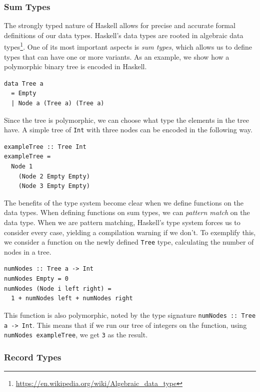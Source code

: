 \documentclass[a4paper,english]{ifimaster}
\begin{document}
\subsubsection{Sum Types}%
\label{ssub:a_powerful_type_system}

The strongly typed nature of Haskell allows for precise and accurate formal definitions of our data types. Haskell's data types are rooted in algebraic data types\footnote{\url{https://en.wikipedia.org/wiki/Algebraic_data_type}}. One of its most important aspects is \textit{sum types}, which allows us to define types that can have one or more variants. As an example, we show how a polymorphic binary tree is encoded in Haskell.

\begin{verbatim}
data Tree a
  = Empty
  | Node a (Tree a) (Tree a)
\end{verbatim}

Since the tree is polymorphic, we can choose what type the elements in the tree have. A simple tree of \texttt{Int} with three nodes can be encoded in the following way.

\begin{verbatim}
exampleTree :: Tree Int
exampleTree =
  Node 1
    (Node 2 Empty Empty)
    (Node 3 Empty Empty)
\end{verbatim}

The benefits of the type system become clear when we define functions on the data types. When defining functions on sum types, we can \textit{pattern match} on the data type. When we are pattern matching, Haskell's type system forces us to consider every case, yielding a compilation warning if we don't. To exemplify this, we consider a function on the newly defined \texttt{Tree} type, calculating the number of nodes in a tree.

\begin{verbatim}
numNodes :: Tree a -> Int
numNodes Empty = 0
numNodes (Node i left right) = 
  1 + numNodes left + numNodes right
\end{verbatim}

This function is also polymorphic, noted by the type signature \texttt{numNodes :: Tree a -> Int}. This means that if we run our tree of integers on the function, using \texttt{numNodes exampleTree}, we get \texttt{3} as the result.

\subsubsection{Record Types}%
\label{ssub:record_types}
\end{document}
